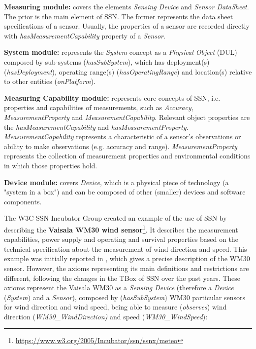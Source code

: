 \documentclass{sig-alternate-05-2015}
\begin{document}
\noindent
\textbf{Measuring module:} covers the elements \textit{Sensing Device} and \textit{Sensor DataSheet}. The prior is the main element of SSN. The former represents the data sheet specifications of a sensor. Usually, the properties of a sensor are recorded directly with \textit{hasMeasurementCapability} property of a \textit{Sensor}.

\noindent
\textbf{System module:} represents the \textit{System} concept as a \textit{Physical Object} (DUL) composed by sub-systems (\textit{hasSubSystem}), which has deployment(s) (\textit{hasDeployment}), operating range(s) (\textit{hasOperatingRange}) and location(s) relative to other entities (\textit{onPlatform}).

\noindent
\textbf{Measuring Capability module:} represents core concepts of SSN, i.e. properties and capabilities of measurements, such as \textit{Accuracy}, \textit{MeasurementProperty} and \textit{MeasurementCapability}. Relevant object properties are the \textit{hasMeasurementCapability} and \textit{hasMeasurementProperty}. \textit{MeasurementCapability} represents a characteristic of a sensor's observations or ability to make observations (e.g. accuracy and range). \textit{MeasurementProperty} represents the collection of measurement properties and environmental conditions in which those properties hold.  

\noindent
\textbf{Device module:} covers \textit{Device}, which is a physical piece of technology (a "system in a box") and can be composed of other (smaller) devices and software components.

The W3C SSN Incubator Group created an example of the use of SSN by describing the \textbf{Vaisala WM30 wind sensor}\footnote{\url{https://www.w3.org/2005/Incubator/ssn/ssnx/meteo}}. It describes the measurement capabilities, power supply and operating and survival properties based on the technical specification about the measurement of wind direction and speed. This example was initially reported in \cite{Compton2009}, which gives a precise description of the WM30 sensor. However, the axioms representing its main definitions and restrictions are different, following the changes in the TBox of SSN over the past years. These axioms represent the Vaisala WM30 as a \textit{Sensing Device} (therefore a \textit{Device} (\textit{System}) and a \textit{Sensor}), composed by (\textit{hasSubSystem}) WM30 particular sensors for wind direction and wind speed, being able to measure (\textit{observes}) wind direction (\textit{WM30\-\_Wind\-Direction)} and speed (\textit{WM30\-\_WindSpeed}):
\end{document}
